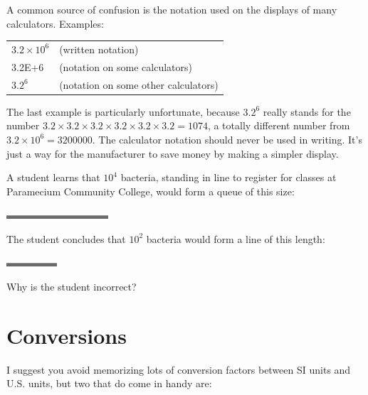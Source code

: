 A common source of confusion is the notation used on the
displays of many calculators. Examples:

\vspace{8mm}

\hspace{10mm}\begin{tabular}{ll}
$3.2 \times 10^6$  &     (written notation)\\
3.2E+6             &     (notation on some calculators)\\
$3.2^6$            &     (notation on some other calculators)
\end{tabular}

\vspace{8mm}

\noindent The last example is particularly unfortunate, because
$3.2^6$ really stands for the number 
$3.2 \times 3.2 \times 3.2 \times 3.2 \times 3.2 \times 3.2= 1074$, a totally different number from $3.2 \times 10^6=3200000$.
The calculator notation should never be used in writing.
It's just a way for the manufacturer to save money by
making a simpler display.

\begin{exmp}
A student learns that $10^4$  bacteria, standing in line to
register for classes at Paramecium Community College, would
form a queue of this size:


\includegraphics{./introduction/figs/sc-bacteria-queue-1}

\noindent The student concludes that $10^2$  bacteria would form a
line of this length:

\includegraphics{./introduction/figs/sc-bacteria-queue-2}

\noindent Why is the student incorrect?
\end{exmp}
\divider
\vspace{2mm}

\section{Conversions}\label{sec:conversions}

I suggest you avoid memorizing lots of conversion factors
between SI units and U.S. units, but two that do come in handy are:

